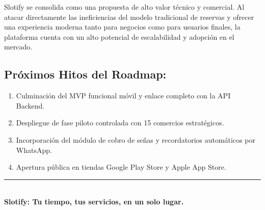 \documentclass[11pt,a4paper]{article}
\begin{document}
Slotify se consolida como una propuesta de alto valor técnico y comercial. Al atacar directamente las ineficiencias del modelo tradicional de reservas y ofrecer una experiencia moderna tanto para negocios como para usuarios finales, la plataforma cuenta con un alto potencial de escalabilidad y adopción en el mercado.

\subsection{Próximos Hitos del Roadmap:}
\begin{enumerate}
    \item Culminación del MVP funcional móvil y enlace completo con la API Backend.
    \item Despliegue de fase piloto controlada con 15 comercios estratégicos.
    \item Incorporación del módulo de cobro de señas y recordatorios automáticos por WhatsApp.
    \item Apertura pública en tiendas Google Play Store y Apple App Store.
\end{enumerate}

\vspace{1.5cm}
\begin{center}
    {\color{textMuted}\rule{0.6\linewidth}{0.8pt}}\\[0.3cm]
    \textbf{\color{primaryDark}Slotify: Tu tiempo, tus servicios, en un solo lugar.}
\end{center}
\end{document}
